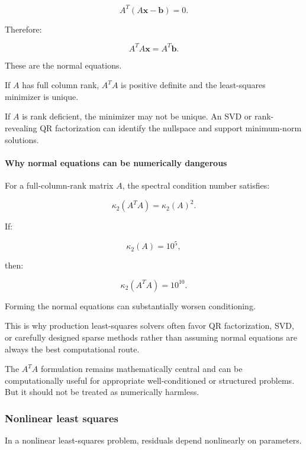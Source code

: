 \[
A^T(A\mathbf x-\mathbf b)=0.
\]

Therefore:

\[
\boxed{A^TA\mathbf x=A^T\mathbf b}.
\]

These are the normal equations.

If \(A\) has full column rank, \(A^TA\) is positive definite and the least-squares minimizer is unique.

If \(A\) is rank deficient, the minimizer may not be unique. An SVD or rank-revealing QR factorization can identify the nullspace and support minimum-norm solutions.

\paragraph{Why normal equations can be numerically dangerous}\label{02-foundations-ii-ch026-why-normal-equations-can-be-numerically-dangerous}

\hypertarget{02-foundations-ii-ch026-why-normal-equations-can-be-numerically-dangerous}{}

For a full-column-rank matrix \(A\), the spectral condition number satisfies:

\[
\boxed{ \kappa_2(A^TA)=\kappa_2(A)^2 }.
\]

If:

\[
\kappa_2(A)=10^5,
\]

then:

\[
\kappa_2(A^TA)=10^{10}.
\]

Forming the normal equations can substantially worsen conditioning.

This is why production least-squares solvers often favor QR factorization, SVD, or carefully designed sparse methods rather than assuming normal equations are always the best computational route.

The \(A^TA\) formulation remains mathematically central and can be computationally useful for appropriate well-conditioned or structured problems. But it should not be treated as numerically harmless.

\subsubsection{Nonlinear least squares}\label{02-foundations-ii-ch026-nonlinear-least-squares}

\hypertarget{02-foundations-ii-ch026-nonlinear-least-squares}{}

In a nonlinear least-squares problem, residuals depend nonlinearly on parameters.

